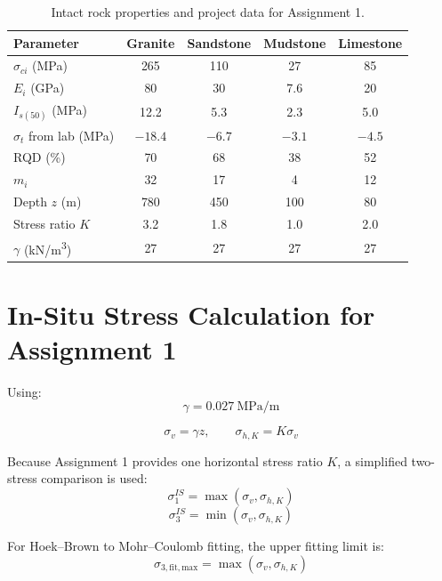 \documentclass[a4paper,12pt]{article}
\begin{document}
\begin{table}[H]
\centering
\small
\begin{tabularx}{\textwidth}{l c c c c}
\toprule
\textbf{Parameter} & \textbf{Granite} & \textbf{Sandstone} & \textbf{Mudstone} & \textbf{Limestone} \\
\midrule
\(\sigma_{ci}\) (MPa) & 265 & 110 & 27 & 85 \\
\(E_i\) (GPa) & 80 & 30 & 7.6 & 20 \\
\(I_{s(50)}\) (MPa) & 12.2 & 5.3 & 2.3 & 5.0 \\
\(\sigma_t\) from lab (MPa) & \(-18.4\) & \(-6.7\) & \(-3.1\) & \(-4.5\) \\
RQD (\%) & 70 & 68 & 38 & 52 \\
\(m_i\) & 32 & 17 & 4 & 12 \\
\midrule
Depth \(z\) (m) & 780 & 450 & 100 & 80 \\
Stress ratio \(K\) & 3.2 & 1.8 & 1.0 & 2.0 \\
\(\gamma\) (kN/m\textsuperscript{3}) & 27 & 27 & 27 & 27 \\
\bottomrule
\end{tabularx}
\caption{Intact rock properties and project data for Assignment 1.}
\end{table}

\section{In-Situ Stress Calculation for Assignment 1}

Using:
\[
\gamma = 0.027~\text{MPa/m}
\]

\[
\sigma_v = \gamma z,
\qquad
\sigma_{h,K} = K\sigma_v
\]

Because Assignment 1 provides one horizontal stress ratio \(K\), a simplified two-stress
comparison is used:
\[
\sigma_1^{IS}=\max(\sigma_v,\sigma_{h,K})
\]
\[
\sigma_3^{IS}=\min(\sigma_v,\sigma_{h,K})
\]

For Hoek--Brown to Mohr--Coulomb fitting, the upper fitting limit is:
\[
\sigma_{3,\mathrm{fit,max}}=\max(\sigma_v,\sigma_{h,K})
\]
\end{document}
